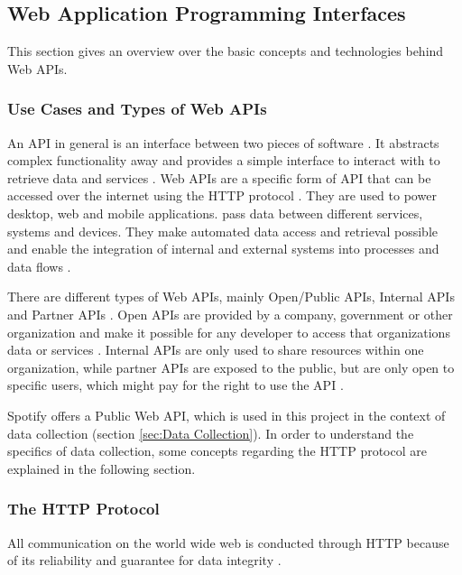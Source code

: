 \subsection{Web Application Programming Interfaces}

This section gives an overview over the basic concepts and technologies behind Web \acp{API}.

\subsubsection{Use Cases and Types of Web APIs}

An \ac{API} in general is an interface between two pieces of software \cite[1]{reddy2011api}.
It abstracts complex functionality away and provides a simple interface
to interact with to retrieve data and services \cite{Mozilla}.
Web APIs are a specific form of API that can be accessed over the internet
using the HTTP protocol \cite{StoplightAPITypes}.
They are used to power desktop, web and mobile applications. pass data between different
services, systems and devices. They make automated data access and retrieval possible
and enable the integration of internal and external systems into processes and data flows \cite{Lane2019WhatIs}.

There are different types of Web APIs, mainly Open/Public APIs, Internal APIs and Partner APIs \cite{StoplightAPITypes}.
Open APIs are provided by a company, government or other organization and make it possible for any developer
to access that organizations data or services \cite{StoplightAPITypes}.
Internal APIs are only used to share resources within one organization, while
partner APIs are exposed to the public, but are only open to specific users, which might pay for
the right to use the API \cite{StoplightAPITypes}.

Spotify offers a Public Web API, which is used in this project in the context of data collection (section \ref{sec:Data Collection}).
In order to understand the specifics of data collection,
some concepts regarding the \ac{HTTP} protocol are explained in the following section.

\subsubsection{The HTTP Protocol}

All communication on the world wide web is conducted through \ac{HTTP}
because of its reliability and guarantee for data integrity \cite[p. 3f]{gourley2002http}.

